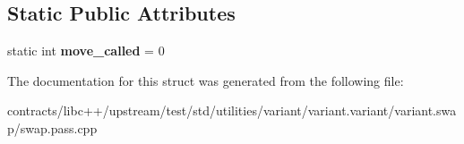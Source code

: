 \subsection*{Static Public Attributes}
\begin{DoxyCompactItemize}
\item 
\mbox{\label{struct_non_throwing_non_noexcept_type_a519d045907f99fc39981d0367d108eb2}} 
static int {\bfseries move\+\_\+called} = 0
\end{DoxyCompactItemize}


The documentation for this struct was generated from the following file\+:\begin{DoxyCompactItemize}
\item 
contracts/libc++/upstream/test/std/utilities/variant/variant.\+variant/variant.\+swap/swap.\+pass.\+cpp\end{DoxyCompactItemize}
